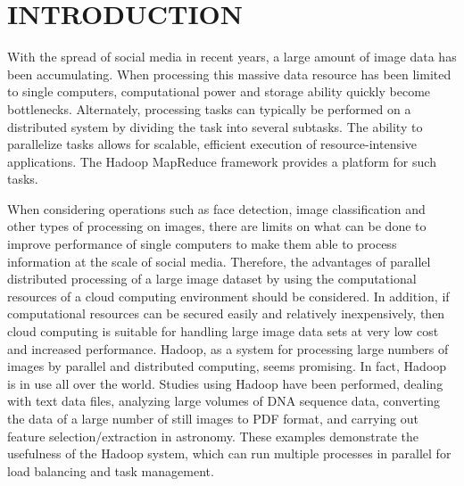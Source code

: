 \documentclass{osuthesis}
\begin{document}
			
				
				
				\chapter{INTRODUCTION}
				With the spread of social media in recent years, a large amount of
				image data has been accumulating. When processing this massive data
				resource has been limited to single computers, computational power and
				storage ability quickly become bottlenecks. Alternately, processing
				tasks can typically be performed on a distributed system by dividing
				the task into several subtasks. The ability to parallelize tasks
				allows for scalable, efficient execution of resource-intensive
				applications.  The Hadoop MapReduce framework provides a platform for
				such tasks.
				
				When considering operations such as face detection, image
				classification\cite{Li2009} and other types of processing on images,
				there are limits on what can be done to improve performance of single
				computers to make them able to process information at the scale of
				social media. Therefore, the advantages of parallel distributed
				processing of a large image dataset by using the computational
				resources of a cloud computing environment should be considered. In
				addition, if computational resources can be secured easily and
				relatively inexpensively, then cloud computing is suitable for
				handling large image data sets at very low cost and increased
				performance. Hadoop, as a system for processing large numbers of
				images by parallel and distributed computing, seems promising. In
				fact, Hadoop is in use all over the world. Studies using Hadoop have
				been performed, dealing with text data files\cite{Lin2010}, analyzing
				large volumes of DNA sequence data\cite{McKenna2010}, converting the
				data of a large number of still images to PDF format, and carrying out
				feature selection/extraction in astronomy\cite{wiley2011}.  These
				examples demonstrate the usefulness of the Hadoop system, which can
				run multiple processes in parallel for load balancing and task
				management.
				
\end{document}

